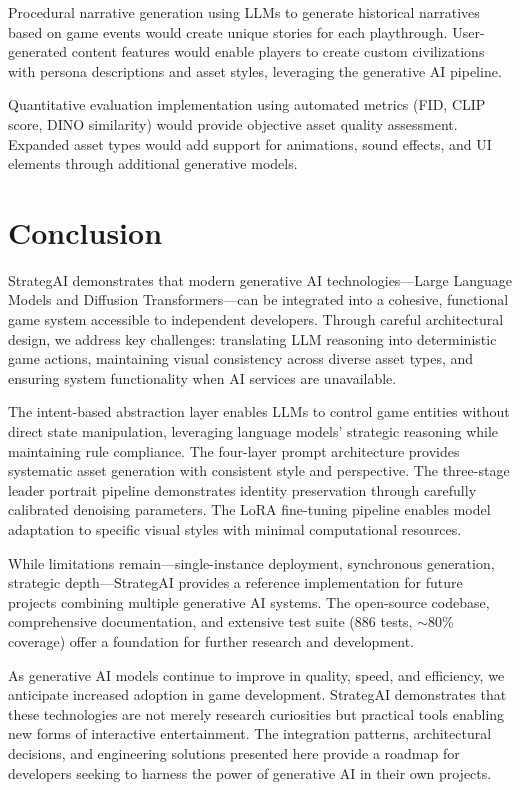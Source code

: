 \documentclass[conference]{IEEEtran}
\begin{document}
Procedural narrative generation using LLMs to generate historical narratives based on game events would create unique stories for each playthrough. User-generated content features would enable players to create custom civilizations with persona descriptions and asset styles, leveraging the generative AI pipeline.

Quantitative evaluation implementation using automated metrics (FID, CLIP score, DINO similarity) would provide objective asset quality assessment. Expanded asset types would add support for animations, sound effects, and UI elements through additional generative models.

\section{Conclusion}
\label{sec:conclusion}

StrategAI demonstrates that modern generative AI technologies---Large Language Models and Diffusion Transformers---can be integrated into a cohesive, functional game system accessible to independent developers. Through careful architectural design, we address key challenges: translating LLM reasoning into deterministic game actions, maintaining visual consistency across diverse asset types, and ensuring system functionality when AI services are unavailable.

The intent-based abstraction layer enables LLMs to control game entities without direct state manipulation, leveraging language models' strategic reasoning while maintaining rule compliance. The four-layer prompt architecture provides systematic asset generation with consistent style and perspective. The three-stage leader portrait pipeline demonstrates identity preservation through carefully calibrated denoising parameters. The LoRA fine-tuning pipeline enables model adaptation to specific visual styles with minimal computational resources.

While limitations remain---single-instance deployment, synchronous generation, strategic depth---StrategAI provides a reference implementation for future projects combining multiple generative AI systems. The open-source codebase, comprehensive documentation, and extensive test suite (886 tests, $\sim$80\% coverage) offer a foundation for further research and development.

As generative AI models continue to improve in quality, speed, and efficiency, we anticipate increased adoption in game development. StrategAI demonstrates that these technologies are not merely research curiosities but practical tools enabling new forms of interactive entertainment. The integration patterns, architectural decisions, and engineering solutions presented here provide a roadmap for developers seeking to harness the power of generative AI in their own projects.
\end{document}
